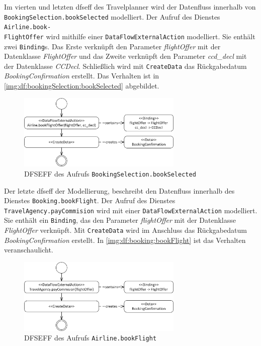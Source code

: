 Im vierten und letzten \gls{dfseff} des Travelplanner wird der Datenfluss innerhalb von \texttt{BookingSelection.bookSelected} modelliert. Der Aufruf des Dienstes \texttt{Airline.book-\\FlightOffer} wird mithilfe einer \texttt{DataFlowExternalAction} modelliert. Sie enthält zwei \texttt{Binding}s. Das Erste verknüpft den Parameter \textit{flightOffer} mit der Datenklasse \textit{FlightOffer} und das Zweite verknüpft den Parameter \textit{ccd\_decl} mit der Datenklasse \textit{CCDecl}. Schließlich wird mit \texttt{CreateData} das Rückgabedatum \textit{BookingConfirmation} erstellt. Das Verhalten ist in \autoref{img:df:bookingSelection:bookSelected} abgebildet. \par
\begin{figure}[h]
	\centering
  	\includegraphics[width=0.7\textwidth]{images/dfseff_bookingSelection_bookSelected.png}
	\caption{DFSEFF des Aufrufs \texttt{BookingSelection.bookSelected}}
	\label{img:df:bookingSelection:bookSelected}
\end{figure}
Der letzte \gls{dfseff} der Modellierung, beschreibt den Datenfluss innerhalb des Dienstes \texttt{Booking.bookFlight}. Der Aufruf des Dienstes \texttt{TravelAgency.payCommision} wird mit einer \texttt{DataFlowExternalAction} modelliert. Sie enthält ein \texttt{Binding}, das den Parameter \textit{flightOffer} mit der Datenklasse \textit{FlightOffer} verknüpft. Mit \texttt{CreateData} wird im Anschluss das Rückgabedatum \textit{BookingConfirmation} erstellt. In \autoref{img:df:booking:bookFlight} ist das Verhalten veranschaulicht.\par
\begin{figure}[h]
	\centering
  	\includegraphics[width=0.7\textwidth]{images/dfseff_booking_bookFlight.png}
	\caption{DFSEFF des Aufrufs \texttt{Airline.bookFlight}}
	\label{img:df:booking:bookFlight}
\end{figure}

